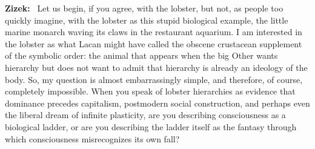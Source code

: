 \documentclass[a4paper,11pt]{article}
\newenvironment{question}{\par\noindent\color{ALIUSRed}\textbf{Zizek:}\ }{\par}
\begin{document}
\begin{question}
Let us begin, if you agree, with the lobster, but not, as people too quickly imagine, with the lobster as this stupid biological example, the little marine monarch waving its claws in the restaurant aquarium. I am interested in the lobster as what Lacan might have called the obscene crustacean supplement of the symbolic order: the animal that appears when the big Other wants hierarchy but does not want to admit that hierarchy is already an ideology of the body. So, my question is almost embarrassingly simple, and therefore, of course, completely impossible. When you speak of lobster hierarchies as evidence that dominance precedes capitalism, postmodern social construction, and perhaps even the liberal dream of infinite plasticity, are you describing consciousness as a biological ladder, or are you describing the ladder itself as the fantasy through which consciousness misrecognizes its own fall?
\end{question}
\end{document}
